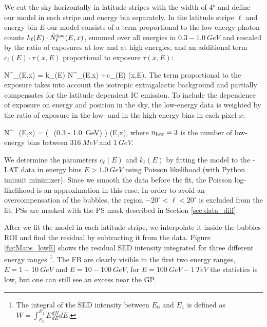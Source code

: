 We cut the sky horizontally in latitude stripes with the width of $\ang{4}$ and define our model in each stripe and energy bin separately. 
In the latitude stripe $\ell$ and energy bin $E$ our model consists of a term proportional to the low-energy photon counts 
$k_{\ell}(E) \cdot \tilde N^{\text{low}}_\ell(E, x)$, summed over all energies in $0.3 - \SI{1.0}{GeV}$ 
and rescaled by the ratio of exposures at low and at high energies,
and an additional term $c_\ell(E) \cdot \tau(x,E)$ proportional to exposure $\tau(x,E)$:

\be
N^\model_{\ell}(E,x) = k_{\ell}(E) \cdot \tilde N^\low_{\ell}(E,x) +c_\ell(E) \cdot \tau(x,E).
\ee
The term proportional to the exposure takes into account the isotropic extragalactic background and partially compensates for the latitude dependent IC emission. To include the dependence of exposure on energy and position in the sky, the low-energy data is weighted by the ratio of exposure in the low- and in the high-energy bins in each pixel $x$:

\be
\tilde N^\low_\ell(E,x) =  \left(\sum_{\epsilon \in (0.3 - \SI{1.0}{GeV})} \right) \cdot \tau(E,x),
\ee
where $n_{\text{low}} = 3$ is the number of low-energy bins between $\SI{316}{MeV}$ and $\SI{1}{GeV}$.


We determine the parameters $c_{\ell}(E)$ and $k_{\ell}(E)$ by fitting the model to the \Fermi-LAT data in energy bins $E > \SI{1.0}{GeV}$
using Poisson likelihood (with Python iminuit minimizer). Since we smooth the data before the fit, the Poisson log-likelihood is an approximation in this case. 
In order to avoid an overcompensation of the \Fermi bubbles, the region $-20^\circ < \ell < 20^\circ$ is excluded from the fit. PSs are masked with the PS mask described in Section \ref{sec:data_diff}.


After we fit the model in each latitude stripe, we interpolate it inside the bubbles ROI and find the residual by subtracting it from the data.
Figure \ref{fig:Maps_lowE} shows the residual SED intensity integrated for three different energy ranges%
\footnote{The integral of the SED intensity between $E_0$ and $E_1$ is defined as
$W = \int_{E_0}^{E_1} E \frac{dN}{dE} dE.$}.
The FB are clearly visible in the first two energy ranges, $E = 1 - \SI{10}{GeV}$ and $E = 10 - \SI{100}{GeV}$, for 
$E = \SI{100}{GeV} - \SI{1}{TeV}$ the statistics is low, but one can still see an excess near the GP.

